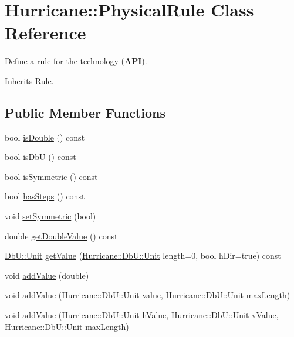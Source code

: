 \hypertarget{classHurricane_1_1PhysicalRule}{}\section{Hurricane\+:\+:Physical\+Rule Class Reference}
\label{classHurricane_1_1PhysicalRule}


Define a rule for the technology ({\bfseries A\+PI}).  




Inherits Rule.

\subsection*{Public Member Functions}
\begin{DoxyCompactItemize}
\item 
bool \mbox{\hyperlink{classHurricane_1_1PhysicalRule_ad419b79177064cab06f7c8dbeccc4dce}{is\+Double}} () const
\item 
bool \mbox{\hyperlink{classHurricane_1_1PhysicalRule_af1e9eeb3499bfd66cedf5756e2d7e2a3}{is\+DbU}} () const
\item 
bool \mbox{\hyperlink{classHurricane_1_1PhysicalRule_a56f3eed5835ad1c268638f0f813fc029}{is\+Symmetric}} () const
\item 
bool \mbox{\hyperlink{classHurricane_1_1PhysicalRule_a8cc9f7f2dfc580e4f91b7f93ce8a26cc}{has\+Steps}} () const
\item 
void \mbox{\hyperlink{classHurricane_1_1PhysicalRule_afc1e61c5b2baa1126a2e253e02f40f40}{set\+Symmetric}} (bool)
\item 
double \mbox{\hyperlink{classHurricane_1_1PhysicalRule_a89a0cd27aec78836500a5066c276bbf0}{get\+Double\+Value}} () const
\item 
\mbox{\hyperlink{group__DbUGroup_ga4fbfa3e8c89347af76c9628ea06c4146}{Db\+U\+::\+Unit}} \mbox{\hyperlink{classHurricane_1_1PhysicalRule_aa3548c58b42cd29cbe07d1a0289416a0}{get\+Value}} (\mbox{\hyperlink{group__DbUGroup_ga4fbfa3e8c89347af76c9628ea06c4146}{Hurricane\+::\+Db\+U\+::\+Unit}} length=0, bool h\+Dir=true) const
\item 
void \mbox{\hyperlink{classHurricane_1_1PhysicalRule_ada08351fb24f36a63f4e3a3c524000a2}{add\+Value}} (double)
\item 
void \mbox{\hyperlink{classHurricane_1_1PhysicalRule_ac25990fc4aff5e5739ae9632f43d9bf8}{add\+Value}} (\mbox{\hyperlink{group__DbUGroup_ga4fbfa3e8c89347af76c9628ea06c4146}{Hurricane\+::\+Db\+U\+::\+Unit}} value, \mbox{\hyperlink{group__DbUGroup_ga4fbfa3e8c89347af76c9628ea06c4146}{Hurricane\+::\+Db\+U\+::\+Unit}} max\+Length)
\item 
void \mbox{\hyperlink{classHurricane_1_1PhysicalRule_a51356a2e3e6cae11c8063b6a092f304d}{add\+Value}} (\mbox{\hyperlink{group__DbUGroup_ga4fbfa3e8c89347af76c9628ea06c4146}{Hurricane\+::\+Db\+U\+::\+Unit}} h\+Value, \mbox{\hyperlink{group__DbUGroup_ga4fbfa3e8c89347af76c9628ea06c4146}{Hurricane\+::\+Db\+U\+::\+Unit}} v\+Value, \mbox{\hyperlink{group__DbUGroup_ga4fbfa3e8c89347af76c9628ea06c4146}{Hurricane\+::\+Db\+U\+::\+Unit}} max\+Length)
\end{DoxyCompactItemize}


